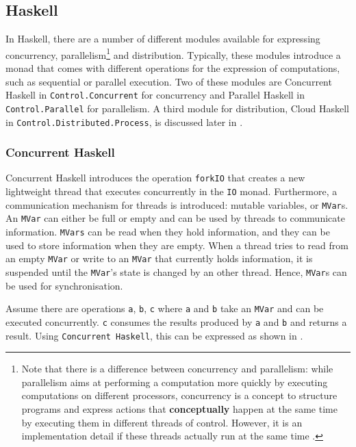 \clearpage
\subsection{Haskell}
In \textsf{Haskell}, there are a number of different modules available for expressing concurrency, parallelism\footnote{Note that there is a difference between concurrency and parallelism: while parallelism aims at performing a computation more quickly by executing computations on different processors, concurrency is a concept to structure programs and express actions that \textbf{conceptually} happen at the same time by executing them in different threads of control. However, it is an implementation detail if these threads actually run at the same time \cite{Marlow}.} and distribution. Typically, these modules introduce a monad that comes with different operations for the expression of computations, such as sequential or parallel execution. Two of these modules are \textsf{Concurrent Haskell} in \texttt{Control.Concurrent} for concurrency and \textsf{Parallel Haskell} in \texttt{Control.Parallel} for parallelism. A third module for distribution, \textsf{Cloud Haskell} in \texttt{Control.Distributed.Process}, is discussed later in .

\subsubsection{Concurrent Haskell}
\textsf{Concurrent Haskell} introduces the operation \texttt{forkIO} that creates a new lightweight thread that executes concurrently in the \texttt{IO} monad. Furthermore, a communication mechanism for threads is introduced: mutable variables, or \texttt{MVar}s. An \texttt{MVar} can either be full or empty and can be used by threads to communicate information. \texttt{MVars} can be read when they hold information, and they can be used to store information when they are empty. When a thread tries to read from an empty \texttt{MVar} or write to an \texttt{MVar} that currently holds information, it is suspended until the \texttt{MVar}'s state is changed by an other thread. Hence, \texttt{MVar}s can be used for synchronisation.

Assume there are operations \texttt{a}, \texttt{b}, \texttt{c} where \texttt{a} and \texttt{b} take an \texttt{MVar} and can be executed concurrently. \texttt{c} consumes the results produced by \texttt{a} and \texttt{b} and returns a result. Using \texttt{Concurrent Haskell}, this can be expressed as shown in .

